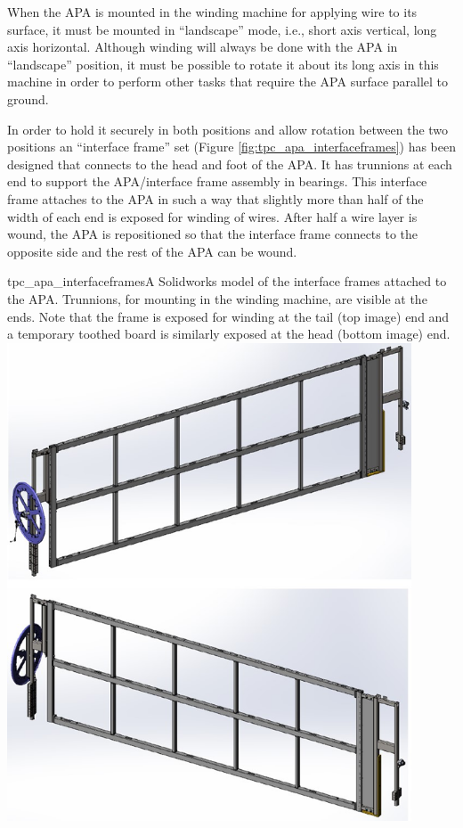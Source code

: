 When the APA is mounted in the winding machine for applying wire to its surface, it must be mounted in ``landscape'' mode, i.e., short axis vertical, long axis horizontal. %
Although winding will always be done with the APA in ``landscape'' position, it must be possible to rotate it about its long axis in this machine in order to perform other tasks that require the APA surface parallel to ground.

In order to hold it securely in both positions and allow rotation between the two positions an ``interface frame'' set (Figure \ref{fig:tpc_apa_interfaceframes}) has been designed that connects to the head and foot of the APA.  It has trunnions at each end  %
to support the APA/interface frame assembly %
in bearings.  This interface frame attaches to the APA in such a way that slightly more than half of the width of each end is exposed for winding of wires.  After half a wire layer is wound, the APA is repositioned so that the interface frame connects to the opposite side and the rest of the APA can be wound.

\begin{cdrfigure}{tpc_apa_interfaceframes}{A Solidworks model of the interface frames attached to the APA. Trunnions, for mounting in the winding machine, are visible at the ends. Note that the frame is exposed for winding at the tail (top image) end and a temporary toothed board is similarly exposed at the head (bottom image) end.}
\includegraphics[width=0.9\textwidth]{figures/tpc_apa_interfaceframes.png} 
\end{cdrfigure}

